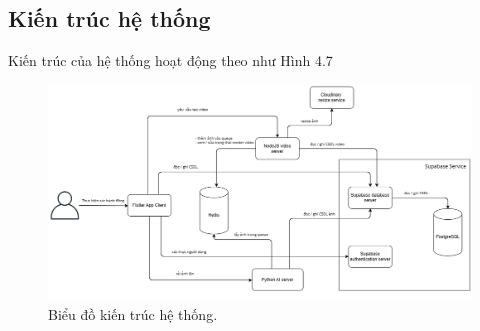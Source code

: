 \subsection{Kiến trúc hệ thống}

Kiến trúc của hệ thống hoạt động theo như Hình 4.7

\begin{figure}[H]
    \centering  
    \includegraphics[width=1.1\textwidth]{figures/c4/4_1/architechture.png}
    \caption{Biểu đồ kiến trúc hệ thống.}
    \label{fig:architecture_diagram}
\end{figure}